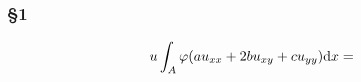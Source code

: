 \subsubsection*{§1}

\label{sec:anhang_rechnung_1}

\begin{align*}
    u
    \int_{A}{\varphi (a u_{xx} + 2b u_{xy} + c u_{yy}) \text{d} x} &= 
\end{align*}